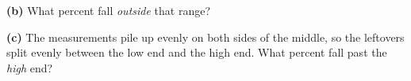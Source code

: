 \documentclass[12pt]{article}
\begin{document}
\begin{enumerate}[leftmargin=1.7em, itemsep=0.13in]
        \hspace{1.0em}\textbf{(b)} What percent fall \emph{outside} that range? \blank{2.0cm}
        \vspace{3pt}

        \hspace{1.0em}\textbf{(c)} The measurements pile up evenly on both sides of the middle,
        so the leftovers split evenly between the low end and the high end. What percent fall
        past the \emph{high} end? \blank{2.0cm}

\end{enumerate}
\end{document}
